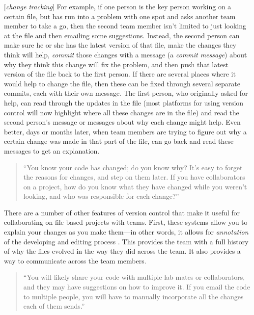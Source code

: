 \documentclass[]{tufte-book}
\begin{document}
{[}\emph{change tracking}{]}
For example, if one person is the key person working on a certain file,
but has run into a problem with one spot and asks another team member to take a
go, then the second team member isn't limited to just looking at the file and
then emailing some suggestions. Instead, the second person can make sure he or
she has the latest version of that file, make the changes they think will help,
\emph{commit} those changes with a message (a \emph{commit message}) about why they think
this change will fix the problem, and then push that latest version of the file
back to the first person. If there are several places where it would help to
change the file, then these can be fixed through several separate commits, each
with their own message. The first person, who originally asked for help, can
read through the updates in the file (most platforms for using version control
will now highlight where all these changes are in the file) and read the second
person's message or messages about why each change might help. Even better, days
or months later, when team members are trying to figure out why a certain change
was made in that part of the file, can go back and read these messages to get an
explanation.

\begin{quote}
``You know your code has changed; do you know why? It's easy to forget the
reasons for changes, and step on them later. If you have collaborators on a
project, how do you know what they have changed while you weren't looking, and
who was responsible for each change?'' \citep{raymond2003art}
\end{quote}

There are a number of other features of version control that make it useful for
collaborating on file-based projects with teams. First, these systems allow you
to explain your changes as you make them---in other words, it allows for
\emph{annotation} of the developing and editing process \citep{raymondunderstanding}. This
provides the team with a full history of why the files evolved in the way they
did across the team. It also provides a way to communicate across the team
members.

\begin{quote}
``You will likely share your code with multiple lab mates or collaborators,
and they may have suggestions on how to improve it. If you email the code
to multiple people, you will have to manually incorporate all the changes
each of them sends.'' \citep{blischak2016quick}
\end{quote}
\end{document}
